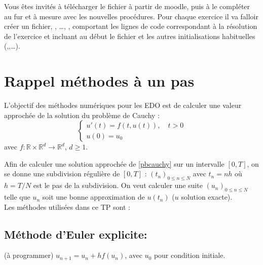 \documentclass[a4paper,12pt,reqno]{amsart}
\begin{document}

Vous êtes invités à télécharger le fichier  à partir de moodle, puis à le compléter au fur et à mesure avec les nouvelles procédures. Pour chaque exercice il va falloir créer un fichier, , \dots, , comportant les lignes de code correspondant à la résolution de l'exercice et incluant au début le fichier  et les autres initialisations habituelles (,,\ldots).

\section{Rappel méthodes à un pas}

L'objectif des méthodes numériques pour les EDO est de calculer une valeur approchée de la solution du problème de Cauchy :
\begin{equation}\label{pbcauchy}\tag{$\star$}
    \begin{cases}
      u'(t)=f(t,u(t)),\quad t>0 \\
      u(0)=u_0
    \end{cases}
\end{equation}
avec $f: \mathbb{R} \times \mathbb{R}^d \to  \mathbb{R}^d$, $d \geq 1$.


Afin de calculer une solution approchée de \eqref{pbcauchy} sur un intervalle $[0,T]$, on se donne une subdivision régulière de $[0,T]$ :
$(t_n)_{0\leq n\leq N}$ avec $t_n=nh$ où $h=T/N$ est le pas de la subdivision.
On veut calculer une suite $(u_n)_{0\leq n\leq N}$ telle
que $u_n$ soit une \og{}bonne\fg{} approximation de $u(t_n)$ ($u$ solution
exacte). \\
Les méthodes utilisées dans ce TP sont :

\subsection*{Méthode d'Euler explicite:} (à programmer)\newline
$ u_{n+1}=u_n+h f(u_n)$, avec $u_0$ pour condition initiale.
\end{document}
